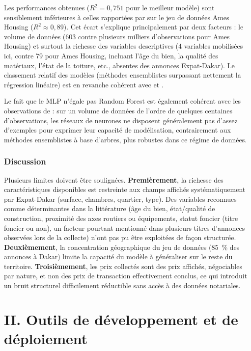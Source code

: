 Les performances obtenues ($R^2 = 0{,}751$ pour le meilleur modèle) sont sensiblement
inférieures à celles rapportées par \citet{sharma2024optimal} sur le jeu de données Ames Housing
($R^2 \approx 0{,}89$). Cet écart s'explique principalement par deux facteurs : le volume de
données (603 contre plusieurs milliers d'observations pour Ames Housing) et surtout la richesse
des variables descriptives (4 variables mobilisées ici, contre 79 pour Ames Housing, incluant
l'âge du bien, la qualité des matériaux, l'état de la toiture, etc., absentes des annonces
Expat-Dakar). Le classement relatif des modèles (méthodes ensemblistes surpassant nettement la
régression linéaire) est en revanche cohérent avec \citet{truong2020housing} et
\citet{nwankwo2023lagos}.

Le fait que le MLP n'égale pas Random Forest est également cohérent avec les observations de
\citet{yazdani2021mldl} : sur un volume de données de l'ordre de quelques centaines
d'observations, les réseaux de neurones ne disposent généralement pas d'assez d'exemples pour
exprimer leur capacité de modélisation, contrairement aux méthodes ensemblistes à base
d'arbres, plus robustes dans ce régime de données.

\subsubsection{Discussion}

Plusieurs limites doivent être soulignées. \textbf{Premièrement}, la richesse des
caractéristiques disponibles est restreinte aux champs affichés systématiquement par
Expat-Dakar (surface, chambres, quartier, type). Des variables reconnues comme déterminantes
dans la littérature (âge du bien, état/qualité de construction, proximité des axes routiers ou
équipements, statut foncier (titre foncier ou non), un facteur pourtant mentionné dans plusieurs
titres d'annonces observées lors de la collecte) n'ont pas pu être exploitées de façon
structurée. \textbf{Deuxièmement}, la concentration géographique du jeu de données (85~\% des
annonces à Dakar) limite la capacité du modèle à généraliser sur le reste du territoire.
\textbf{Troisièmement}, les prix collectés sont des prix affichés, négociables par nature, et
non des prix de transaction effectivement conclus, ce qui introduit un bruit structurel
difficilement réductible sans accès à des données notariales.

\section{II. Outils de développement et de déploiement}

